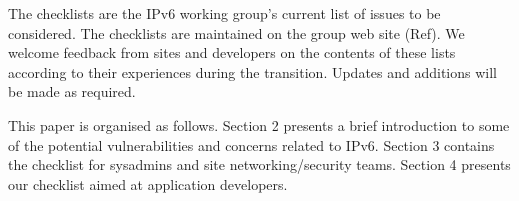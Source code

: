 The checklists are the IPv6 working group's current list of issues to be considered. The checklists are maintained on the group web site (Ref). We welcome feedback from sites and developers on the contents of these lists according to their experiences during the transition. Updates and additions will be made as required.

This paper is organised as follows. Section 2 presents a brief introduction to some of the potential vulnerabilities and concerns related to IPv6. Section 3 contains the checklist for sysadmins and site networking/security teams. Section 4 presents our checklist aimed at application developers.





